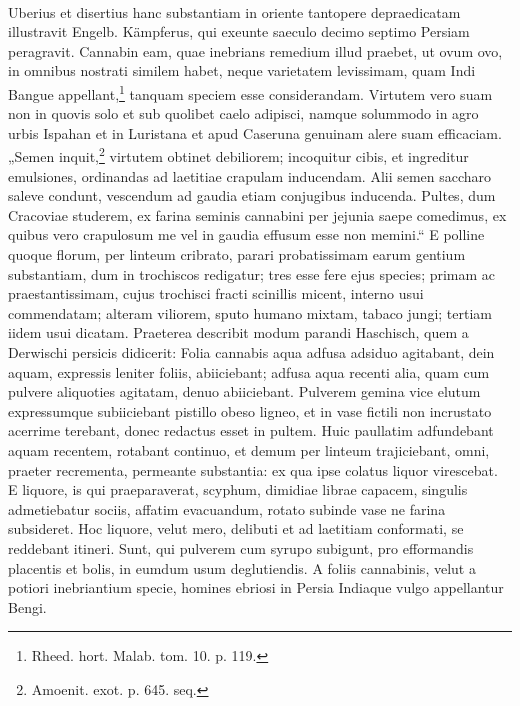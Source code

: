 \documentclass[a4paper, 11pt, oneside, polutonikogreek, english]{article}
\begin{document}
\paragraph{}
Uberius et disertius hanc substantiam in oriente tantopere depraedicatam illustravit Engelb. Kämpferus, qui exeunte saeculo decimo septimo Persiam peragravit. Cannabin eam, quae inebrians remedium illud praebet, ut ovum ovo, in omnibus nostrati similem habet, neque varietatem levissimam, quam Indi Bangue appellant,\footnote{Rheed. hort. Malab. tom. 10. p. 119.} tanquam speciem esse considerandam. Virtutem vero suam non in quovis solo et sub quolibet caelo adipisci, namque solummodo in agro urbis Ispahan et in Luristana et apud Caseruna genuinam alere suam efficaciam. „Semen inquit,\footnote{Amoenit. exot. p. 645. seq.} virtutem obtinet debiliorem; incoquitur cibis, et ingreditur emulsiones, ordinandas ad laetitiae crapulam inducendam. Alii semen saccharo saleve condunt, vescendum ad gaudia etiam conjugibus inducenda. Pultes, dum Cracoviae studerem, ex farina seminis cannabini per jejunia saepe comedimus, ex quibus vero crapulosum me vel in gaudia effusum esse non memini.“ E polline quoque florum, per linteum cribrato, parari probatissimam earum gentium substantiam, dum in trochiscos redigatur; tres esse fere ejus species; primam ac praestantissimam, cujus trochisci fracti scinillis micent, interno usui commendatam; alteram viliorem, sputo humano mixtam, tabaco jungi; tertiam iidem usui dicatam. Praeterea describit modum parandi Haschisch, quem a Derwischi persicis didicerit: Folia cannabis aqua adfusa adsiduo agitabant, dein aquam, expressis leniter foliis, abiiciebant; adfusa aqua recenti alia, quam cum pulvere aliquoties agitatam, denuo abiiciebant. Pulverem gemina vice elutum expressumque subiiciebant pistillo obeso ligneo, et in vase fictili non incrustato acerrime terebant, donec redactus esset in pultem. Huic paullatim adfundebant aquam recentem, rotabant continuo, et demum per linteum trajiciebant, omni, praeter recrementa, permeante substantia: ex qua ipse colatus liquor virescebat. E liquore, is qui praeparaverat, scyphum, dimidiae librae capacem, singulis admetiebatur sociis, affatim evacuandum, rotato subinde vase ne farina subsideret. Hoc liquore, velut mero, delibuti et ad laetitiam conformati, se reddebant itineri. Sunt, qui pulverem cum syrupo subigunt, pro efformandis placentis et bolis, in eumdum usum deglutiendis. A foliis cannabinis, velut a potiori inebriantium specie, homines ebriosi in Persia Indiaque vulgo appellantur Bengi.
\end{document}
